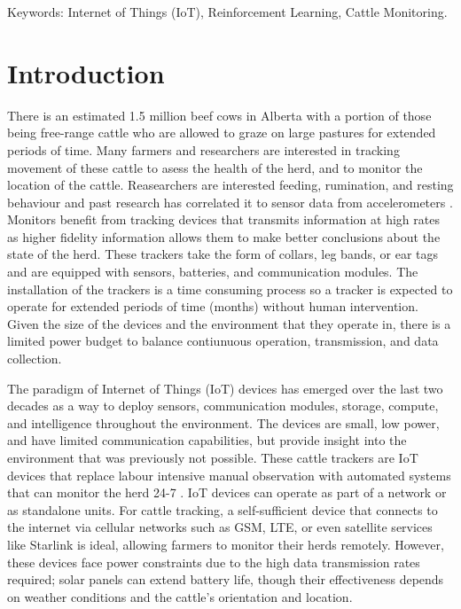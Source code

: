\documentclass[10pt]{cai}
\begin{document}
\begin{keywords}{Keywords:}
Internet of Things (IoT), Reinforcement Learning, Cattle Monitoring.
\end{keywords}
\copyrightnotice

\section{Introduction}

There is an estimated 1.5 million beef cows in Alberta with a portion of those being free-range cattle who are allowed to graze on large pastures for extended periods of time.
Many farmers and researchers are interested in tracking movement of these cattle to asess the health of the herd, and to monitor the location of the cattle.
Reasearchers are interested feeding, rumination, and resting behaviour and past research has correlated it to sensor data from accelerometers \cite{unoldIoTBasedCowHealth2020}.
Monitors benefit from tracking devices that transmits information at high rates as higher fidelity information allows them to make better conclusions about the state of the herd.
These trackers take the form of collars, leg bands, or ear tags and are equipped with sensors, batteries, and communication modules.
The installation of the trackers is a time consuming process so a tracker is expected to operate for extended periods of time (months) without human intervention.
Given the size of the devices and the environment that they operate in, there is a limited power budget to balance contiunuous operation, transmission, and data collection.

The paradigm of Internet of Things (IoT) devices has emerged over the last two decades as a way to deploy sensors, communication modules, storage, compute, and intelligence throughout the environment.
The devices are small, low power, and have limited communication capabilities, but provide insight into the environment that was previously not possible.
These cattle trackers are IoT devices that replace labour intensive manual observation with automated systems that can monitor the herd 24-7 \cite{unoldIoTBasedCowHealth2020} \cite{moutaouakilDigitalFarmingSurvey2023}.
IoT devices can operate as part of a network or as standalone units. 
For cattle tracking, a self-sufficient device that connects to the internet via cellular networks such as GSM, LTE, or even satellite services like Starlink is ideal, allowing farmers to monitor their herds remotely. 
However, these devices face power constraints due to the high data transmission rates required; solar panels can extend battery life, though their effectiveness depends on weather conditions and the cattle's orientation and location.
\end{document}
